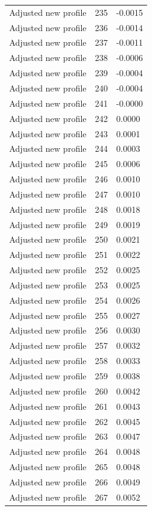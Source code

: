 \begin{table}[htbp]
\begin{tabular}{lll}
Adjusted new profile & 235 & -0.0015 \\
Adjusted new profile & 236 & -0.0014 \\
Adjusted new profile & 237 & -0.0011 \\
Adjusted new profile & 238 & -0.0006 \\
Adjusted new profile & 239 & -0.0004 \\
Adjusted new profile & 240 & -0.0004 \\
Adjusted new profile & 241 & -0.0000 \\
Adjusted new profile & 242 & 0.0000 \\
Adjusted new profile & 243 & 0.0001 \\
Adjusted new profile & 244 & 0.0003 \\
Adjusted new profile & 245 & 0.0006 \\
Adjusted new profile & 246 & 0.0010 \\
Adjusted new profile & 247 & 0.0010 \\
Adjusted new profile & 248 & 0.0018 \\
Adjusted new profile & 249 & 0.0019 \\
Adjusted new profile & 250 & 0.0021 \\
Adjusted new profile & 251 & 0.0022 \\
Adjusted new profile & 252 & 0.0025 \\
Adjusted new profile & 253 & 0.0025 \\
Adjusted new profile & 254 & 0.0026 \\
Adjusted new profile & 255 & 0.0027 \\
Adjusted new profile & 256 & 0.0030 \\
Adjusted new profile & 257 & 0.0032 \\
Adjusted new profile & 258 & 0.0033 \\
Adjusted new profile & 259 & 0.0038 \\
Adjusted new profile & 260 & 0.0042 \\
Adjusted new profile & 261 & 0.0043 \\
Adjusted new profile & 262 & 0.0045 \\
Adjusted new profile & 263 & 0.0047 \\
Adjusted new profile & 264 & 0.0048 \\
Adjusted new profile & 265 & 0.0048 \\
Adjusted new profile & 266 & 0.0049 \\
Adjusted new profile & 267 & 0.0052 \\

\end{tabular}
\end{table}
